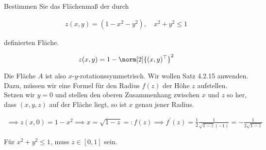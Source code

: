 
\begin{exercise}

Bestimmen Sie das Flächenmaß der durch

\begin{align*}
    z(x, y) = (1 - x^2 - y^2),
    \quad
    x^2 + y^2 \leq 1
\end{align*}

definierten Fläche.

\end{exercise}


\begin{solution}

\begin{align*}
    z(x, y) = 1 - \norm[2]{(x, y)^\top}^2
\end{align*}

Die Fläche $A$ ist also $x$-$y$-rotationssymmetrisch.
Wir wollen Satz 4.2.15 anwenden.
Dazu, müssen wir eine Formel für den Radius $f(z)$ der Höhe $z$ aufstellen.
Setzen wir $y = 0$ und stellen den oberen Zusammenhang zwischen $x$ und $z$ so her, dass $(x, y, z)$ auf der Fläche liegt, so ist $x$ genau jener Radius.

\begin{align*}
    \implies
    z(x, 0) = 1 - x^2
    \implies
    x = \sqrt{1 - z} =: f(z)
    \implies
    f^\prime(z) = \frac{1}{2} \frac{1}{\sqrt{1 - z} (-1)} = -\frac{1}{2 \sqrt{1 - z}}
\end{align*}

Für $x^2 + y^2 \leq 1$, muss $z \in [0, 1]$ sein.


\end{solution}
